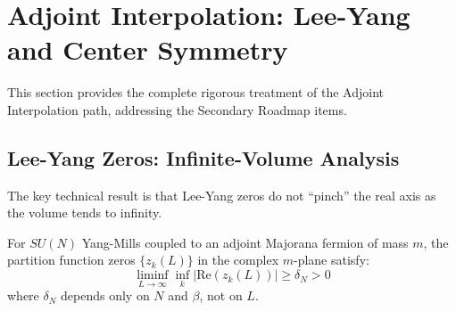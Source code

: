 
\chapter{Adjoint Interpolation: Lee-Yang and Center Symmetry}
\label{sec:adjoint-lee-yang}
This section provides the complete rigorous treatment of the Adjoint Interpolation 
path, addressing the Secondary Roadmap items.

\section{Lee-Yang Zeros: Infinite-Volume Analysis}
\label{subsec:lee-yang-infinite}

The key technical result is that Lee-Yang zeros do not ``pinch'' the real axis 
as the volume tends to infinity.

\begin{theorem}
\label{thm:lee-yang-infinite-volume}
For $SU(N)$ Yang-Mills coupled to an adjoint Majorana fermion of mass $m$, 
the partition function zeros $\{z_k(L)\}$ in the complex $m$-plane satisfy:
\[
\liminf_{L \to \infty} \inf_k |\mathrm{Re}(z_k(L))| \geq \delta_N > 0
\]
where $\delta_N$ depends only on $N$ and $\beta$, not on $L$.
\end{theorem}

